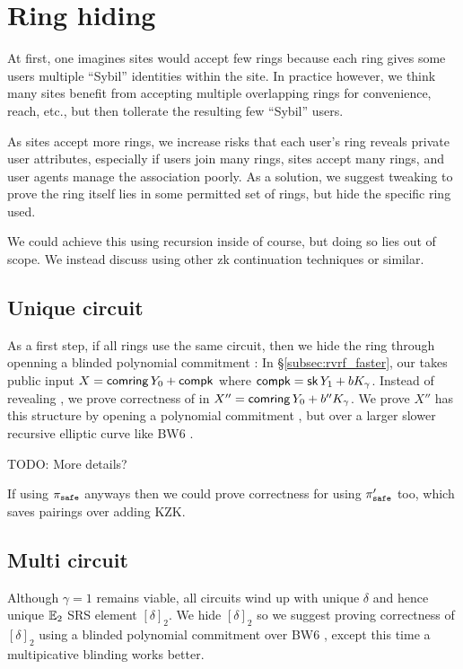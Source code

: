 \section{Ring hiding}%
\label{sec:ring_hiding}

At first, one imagines sites would accept few rings because each ring
gives some users multiple ``Sybil'' identities within the site.
In practice however, we think many sites benefit from accepting
multiple overlapping rings for convenience, reach, etc., but then
tollerate the resulting few ``Sybil'' users.

As sites accept more rings, we increase risks that each user's ring
\ctx reveals private user attributes, especially if
 users join many rings, sites accept many rings, and
 user agents manage the association poorly.
As a solution, we suggest tweaking \pifast to prove the ring itself
lies in some permitted set of rings, but hide the specific ring used.

We could achieve this using recursion inside \pifast of course,
but doing so lies out of scope.  We instead discuss using other
zk continuation techniques or similar.

\subsection{Unique circuit}

As a first step, if all rings use the same circuit, then we hide the
ring through openning a blinded polynomial commitment \cite{KZG}: 
In \S\ref{subsec:rvrf_faster}, our \pifast takes public input
 $X = \mathsf{comring}\, Y_0 + \mathsf{compk}$ where $\mathsf{compk} = \mathsf{sk}\, Y_1 + b K_\gamma$.
Instead of revealing \comring, we prove correctness of \comring in
 $X'' = \mathsf{comring}\, Y_0 + b'' K_\gamma$.
We prove $X''$ has this structure by opening a polynomial commitment
\cite{KZG}, but over a larger slower recursive elliptic curve
 like BW6 \cite{BW6}.

TODO: More details?

If using $\pi_{\mathtt{safe}}$ anyways then we could prove correctness for \comring
using $\pi_{\mathtt{safe}}'$ too, which saves pairings over adding KZK.

\subsection{Multi circuit}

Although $\gamma=1$ remains viable, all circuits wind up with
unique $\delta$ and hence unique ${\mathbb{E}}_2$ SRS element $[\delta]_2$.
We hide $[\delta]_2$ so we suggest proving correctness of $[\delta]_2$
using a blinded polynomial commitment \cite{KZG} over BW6 \cite{BW6},
except this time a multipicative blinding works better.

